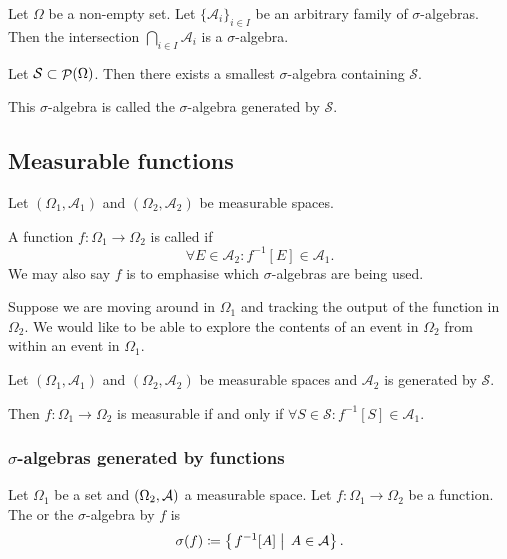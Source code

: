 \begin{lemma}
Let $\Omega$ be a non-empty set. Let $\{\mathcal{A}_i\}_{i\in I}$ be an arbitrary family of $\sigma$-algebras. Then the intersection $\bigcap_{i\in I}\mathcal{A}_i$ is a $\sigma$-algebra.
\end{lemma}
\begin{corollary}
Let $\mathcal{S}\subset \mathop{\mathcal{P}}(\Omega)$. Then there exists a smallest $\sigma$-algebra containing $\mathcal{S}$.
\end{corollary}
This $\sigma$-algebra is called the $\sigma$-algebra generated by $\mathcal{S}$.

\subsection{Measurable functions}
\begin{definition}
Let $(\Omega_1, \mathcal{A}_1)$ and $(\Omega_2, \mathcal{A}_2)$ be measurable spaces.

A function $f:\Omega_1 \to \Omega_2$ is called  if
\[ \forall E\in\mathcal{A}_2: f^{-1}[E] \in\mathcal{A}_1. \]
We may also say $f$ is  to emphasise which $\sigma$-algebras are being used.
\end{definition}
Suppose we are moving around in $\Omega_1$ and tracking the output of the function in $\Omega_2$. We would like to be able to explore the contents of an event in $\Omega_2$ from within an event in $\Omega_1$.

\begin{lemma} \label{measurableFromGeneratingSet}
Let $(\Omega_1, \mathcal{A}_1)$ and $(\Omega_2, \mathcal{A}_2)$ be measurable spaces and $\mathcal{A}_2$ is generated by $\mathcal{S}$.

Then $f: \Omega_1\to \Omega_2$ is measurable \textup{if and only if} $\forall S\in\mathcal{S}: f^{-1}[S] \in \mathcal{A}_1$.
\end{lemma}

\subsubsection{$\sigma$-algebras generated by functions}
\begin{definition}
Let $\Omega_1$ be a set and $\left( \Omega_2, \mathcal{A} \right)$ a measurable space. Let $f: \Omega_1\to \Omega_2$ be a function. The  or the $\sigma$-algebra  by $f$ is
\[ \sigma(f) \coloneqq \left\{\left. f^{-1}[A] \;\right|\; A\in \mathcal{A} \right\}. \]
\end{definition}

